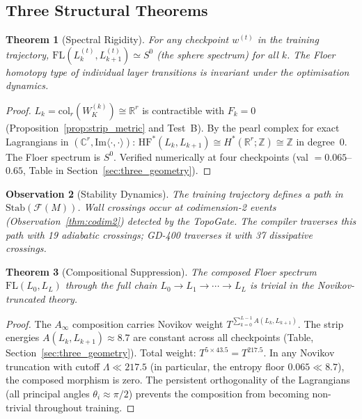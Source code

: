 \documentclass[11pt]{amsart}
\newtheorem{theorem}{Theorem}[section]
\newtheorem{observation}[theorem]{Observation}
\begin{document}
\subsection{Three Structural Theorems}
\label{sec:three_theorems}

\begin{theorem}[Spectral Rigidity]
\label{thm:spectral_rigidity}
For any checkpoint $w^{(t)}$ in the training trajectory,
$\mathrm{FL}(L_k^{(t)}, L_{k+1}^{(t)}) \simeq S^0$
(the sphere spectrum) for all $k$.
The Floer homotopy type of individual layer transitions is invariant
under the optimisation dynamics.
\end{theorem}

\begin{proof}
$L_k = \mathrm{col}_r(W_K^{(k)}) \cong \mathbb{R}^r$ is contractible
with $F_k = 0$ (Proposition~\ref{prop:strip_metric} and Test~B).
By the pearl complex for exact Lagrangians in $(\mathbb{C}^r, \mathrm{Im}\langle\cdot,\cdot\rangle)$:
$\mathrm{HF}^*(L_k, L_{k+1}) \cong H^*(\mathbb{R}^r; \mathbb{Z}) \cong \mathbb{Z}$
in degree~0.
The Floer spectrum is $S^0$.
Verified numerically at four checkpoints
(val $= 0.065$--$0.65$, Table in Section~\ref{sec:three_geometry}).
\end{proof}

\begin{observation}[Stability Dynamics]
\label{obs:stab_dynamics}
The training trajectory defines a path in $\mathrm{Stab}(\mathcal{F}(M))$.
Wall crossings occur at codimension-2 events
(Observation~\ref{thm:codim2}) detected by the TopoGate.
The compiler traverses this path with 19 adiabatic crossings;
GD-400 traverses it with 37 dissipative crossings.
\end{observation}

\begin{theorem}[Compositional Suppression]
\label{thm:compositional_suppression}
The composed Floer spectrum $\mathrm{FL}(L_0, L_L)$ through the
full chain $L_0 \to L_1 \to \cdots \to L_L$ is trivial in the
Novikov-truncated theory.
\end{theorem}

\begin{proof}
The $A_\infty$ composition carries Novikov weight
$T^{\sum_{k=0}^{L-1} A(L_k, L_{k+1})}$.
The strip energies $A(L_k, L_{k+1}) \approx 8.7$ are constant
across all checkpoints (Table, Section~\ref{sec:three_geometry}).
Total weight: $T^{5 \times 43.5} = T^{217.5}$.
In any Novikov truncation with cutoff $\Lambda \ll 217.5$
(in particular, the entropy floor $0.065 \ll 8.7$),
the composed morphism is zero.
The persistent orthogonality of the Lagrangians
(all principal angles $\theta_i \approx \pi/2$) prevents
the composition from becoming non-trivial throughout training.
\end{proof}
\end{document}
